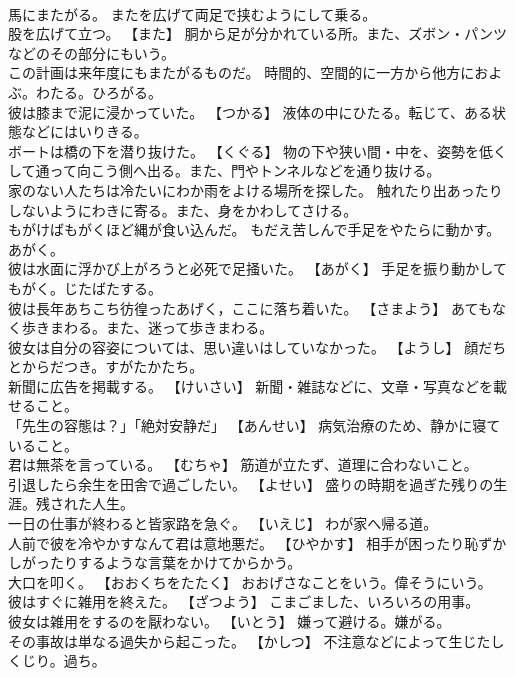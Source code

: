 \documentclass[8pt]{extreport}
\begin{document}
\begin{CJK}{UTF8}{min}
\\	馬にまたがる。	またを広げて両足で挟むようにして乗る。
\\	股を広げて立つ。	【また】 胴から足が分かれている所。また、ズボン・パンツなどのその部分にもいう。
\\	この計画は来年度にもまたがるものだ。	時間的、空間的に一方から他方におよぶ。わたる。ひろがる。
\\	彼は膝まで泥に浸かっていた。	【つかる】 液体の中にひたる。転じて、ある状態などにはいりきる。
\\	ボートは橋の下を潜り抜けた。	【くぐる】 物の下や狭い間・中を、姿勢を低くして通って向こう側へ出る。また、門やトンネルなどを通り抜ける。
\\	家のない人たちは冷たいにわか雨をよける場所を探した。	触れたり出あったりしないようにわきに寄る。また、身をかわしてさける。
\\	もがけばもがくほど縄が食い込んだ。	もだえ苦しんで手足をやたらに動かす。あがく。
\\	彼は水面に浮かび上がろうと必死で足掻いた。	【あがく】 手足を振り動かしてもがく。じたばたする。
\\	彼は長年あちこち彷徨ったあげく，ここに落ち着いた。	【さまよう】 あてもなく歩きまわる。また、迷って歩きまわる。
\\	彼女は自分の容姿については、思い違いはしていなかった。	【ようし】 顔だちとからだつき。すがたかたち。
\\	新聞に広告を掲載する。	【けいさい】 新聞・雑誌などに、文章・写真などを載せること。
\\	「先生の容態は？」「絶対安静だ」	【あんせい】 病気治療のため、静かに寝ていること。
\\	君は無茶を言っている。	【むちゃ】 筋道が立たず、道理に合わないこと。
\\	引退したら余生を田舎で過ごしたい。	【よせい】 盛りの時期を過ぎた残りの生涯。残された人生。
\\	一日の仕事が終わると皆家路を急ぐ。	【いえじ】 わが家へ帰る道。
\\	人前で彼を冷やかすなんて君は意地悪だ。	【ひやかす】 相手が困ったり恥ずかしがったりするような言葉をかけてからかう。
\\	大口を叩く。	【おおくちをたたく】 おおげさなことをいう。偉そうにいう。
\\	彼はすぐに雑用を終えた。	【ざつよう】 こまごました、いろいろの用事。
\\	彼女は雑用をするのを厭わない。	【いとう】 嫌って避ける。嫌がる。
\\	その事故は単なる過失から起こった。	【かしつ】 不注意などによって生じたしくじり。過ち。

\end{CJK}
\end{document}
